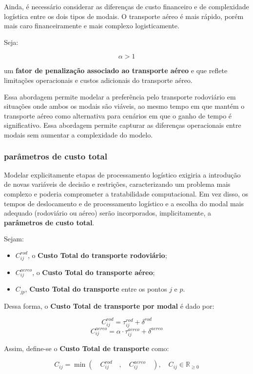 Ainda, é necessário considerar as diferenças de custo financeiro e de complexidade logística entre os dois tipos de modais. O transporte aéreo é mais rápido, porém mais caro financeiramente e mais complexo logisticamente.

Seja:

\[
\alpha > 1
\]

um \textbf{fator de penalização associado ao transporte aéreo} e que reflete limitações operacionais e custos adicionais do transporte aéreo. 

Essa abordagem permite modelar a preferência pelo transporte rodoviário em situações onde ambos os modais são viáveis, ao mesmo tempo em que mantém o transporte aéreo como alternativa para cenários em que o ganho de tempo é significativo. Essa abordagem permite capturar as diferenças operacionais entre modais sem aumentar a complexidade do modelo.

\subsubsection{parâmetros de custo total}

Modelar explicitamente etapas de processamento logístico exigiria a introdução de novas variáveis de decisão e restrições, caracterizando um problema mais complexo e poderia comprometer a tratabilidade computacional. Em vez disso, os tempos de deslocamento e de processamento logístico e a escolha do modal mais adequado (rodoviário ou aéreo) serão incorporados, implicitamente, a \textbf{parâmetros de custo total}.

Sejam:
\begin{itemize}
    \item $C_{ij}^{rod}$, o \textbf{Custo Total do transporte rodoviário};
    \item $C_{ij}^{aereo}$, o \textbf{Custo Total do transporte aéreo};
    \item $C_{jp}$, \textbf{Custo Total do transporte} entre os pontos $j$ e $p$.
\end{itemize}

Dessa forma, o \textbf{Custo Total de transporte por modal} é dado por:

\[
C_{ij}^{rod} = \tau_{ij}^{rod} + \delta^{rod}
\]
\[
C_{ij}^{aereo} = \alpha \cdot \tau_{ij}^{aereo} + \delta^{aereo}
\]


Assim, define-se o \textbf{Custo Total de transporte} como:

\[
C_{ij} = \min \left( \quad C_{ij}^{rod} \quad , \quad C_{ij}^{aereo} \quad \right),  \quad C_{ij} \in \mathbb{R}_{\geq 0}
\]

